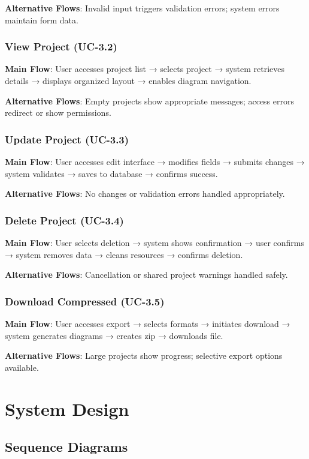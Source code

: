 \textbf{Alternative Flows}: Invalid input triggers validation errors; system errors maintain form data.

\subsubsection{View Project (UC-3.2)}
\textbf{Main Flow}: User accesses project list → selects project → system retrieves details → displays organized layout → enables diagram navigation.

\textbf{Alternative Flows}: Empty projects show appropriate messages; access errors redirect or show permissions.

\subsubsection{Update Project (UC-3.3)}
\textbf{Main Flow}: User accesses edit interface → modifies fields → submits changes → system validates → saves to database → confirms success.

\textbf{Alternative Flows}: No changes or validation errors handled appropriately.

\subsubsection{Delete Project (UC-3.4)}
\textbf{Main Flow}: User selects deletion → system shows confirmation → user confirms → system removes data → cleans resources → confirms deletion.

\textbf{Alternative Flows}: Cancellation or shared project warnings handled safely.

\subsubsection{Download Compressed (UC-3.5)}
\textbf{Main Flow}: User accesses export → selects formats → initiates download → system generates diagrams → creates zip → downloads file.

\textbf{Alternative Flows}: Large projects show progress; selective export options available.

\section{System Design}

\subsection{Sequence Diagrams}

